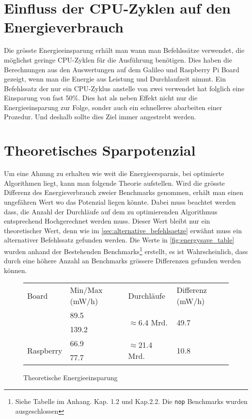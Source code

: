 \section{Einfluss der CPU-Zyklen auf den Energieverbrauch}
Die grösste Energieeinsparung erhält man wann man Befehlssätze verwendet, die möglichst geringe CPU-Zyklen für die Ausführung benötigen. Dies haben die Berechnungen aus den Auswertungen auf dem Galileo und Raspberry Pi Board gezeigt, wenn man die Energie aus Leistung und Durchlaufzeit nimmt. Ein Befehlssatz der nur ein CPU-Zyklus anstelle von zwei verwendet hat folglich eine Einsparung von fast 50\%. Dies hat als neben Effekt nicht nur die Energieeinsparung zur Folge, sonder auch ein schnelleres abarbeiten einer Prozedur. Und deshalb sollte dies Ziel immer angestrebt werden.

\section{Theoretisches Sparpotenzial}
Um eine Ahnung zu erhalten wie weit die Energieersparnis, bei optimierte Algorithmen liegt, kann man folgende Theorie aufstellen. Wird die grösste Differenz des Energieverbrauch zweier Benchmarks genommen, erhält man einen ungefähren Wert wo das Potenzial liegen könnte. Dabei muss beachtet werden dass, die Anzahl der Durchläufe auf dem zu optimierenden Algorithmus entsprechend Hochgerechnet werden muss. Dieser Wert bleibt nur ein theoretischer Wert, denn wie im \autoref{sec:alternative_befehlsaetze} erwähnt muss ein alternativer Befehlssatz gefunden werden. Die Werte in \autoref{fig:energysave_table} wurden anhand der Bestehenden Benchmarks\footnote{Siehe Tabelle im Anhang. Kap. 1.2 und Kap.2.2. Die \texttt{nop} Benchmarks wurden ausgeschlossen} erstellt, es ist Wahrscheinlich, dass durch eine höhere Anzahl an Benchmarks grössere Differenzen gefunden werden können.


\begin{figure}[H]
\center
\begin{tabular}{ |l|l|l|l| }
\hline
Board & Min/Max (mW/h) & Durchläufe & Differenz (mW/h) \\ \hhline{|=|=|=|=|}
\multirow{2}{*}{Galileo} & 89.5 & \multirow{2}{*}{$\approx$6.4 Mrd.} & \multirow{2}{*}{49.7} \\ 
 & 139.2 & &  \\ \hline
\multirow{2}{*}{Raspberry} & 66.9 & \multirow{2}{*}{$\approx$21.4 Mrd.} & \multirow{2}{*}{10.8} \\ 
 & 77.7 & &  \\
\hline
\end{tabular}
\caption{Theoretische Energieeinsparung}
\label{fig:energysave_table}
\end{figure}


